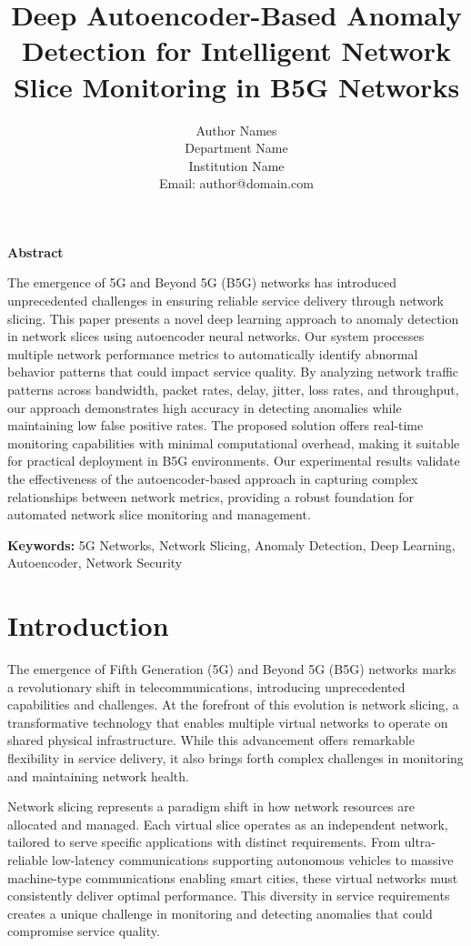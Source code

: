 \documentclass[12pt, a4paper]{article}
\title{Deep Autoencoder-Based Anomaly Detection for Intelligent Network Slice Monitoring in B5G Networks}
\author{
Author Names\\
Department Name\\
Institution Name\\
Email: author@domain.com
}
\begin{document}
\maketitle

\noindent\textbf{Abstract}
\vspace{0.5cm}

The emergence of 5G and Beyond 5G (B5G) networks has introduced unprecedented challenges in ensuring reliable service delivery through network slicing. This paper presents a novel deep learning approach to anomaly detection in network slices using autoencoder neural networks. Our system processes multiple network performance metrics to automatically identify abnormal behavior patterns that could impact service quality. By analyzing network traffic patterns across bandwidth, packet rates, delay, jitter, loss rates, and throughput, our approach demonstrates high accuracy in detecting anomalies while maintaining low false positive rates. The proposed solution offers real-time monitoring capabilities with minimal computational overhead, making it suitable for practical deployment in B5G environments. Our experimental results validate the effectiveness of the autoencoder-based approach in capturing complex relationships between network metrics, providing a robust foundation for automated network slice monitoring and management.

\vspace{0.5cm}
\noindent\textbf{Keywords:} 5G Networks, Network Slicing, Anomaly Detection, Deep Learning, Autoencoder, Network Security

\section{Introduction}
The emergence of Fifth Generation (5G) and Beyond 5G (B5G) networks marks a revolutionary shift in telecommunications, introducing unprecedented capabilities and challenges. At the forefront of this evolution is network slicing, a transformative technology that enables multiple virtual networks to operate on shared physical infrastructure. While this advancement offers remarkable flexibility in service delivery, it also brings forth complex challenges in monitoring and maintaining network health.

Network slicing represents a paradigm shift in how network resources are allocated and managed. Each virtual slice operates as an independent network, tailored to serve specific applications with distinct requirements. From ultra-reliable low-latency communications supporting autonomous vehicles to massive machine-type communications enabling smart cities, these virtual networks must consistently deliver optimal performance. This diversity in service requirements creates a unique challenge in monitoring and detecting anomalies that could compromise service quality.
\end{document}
